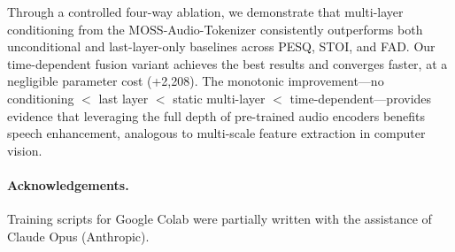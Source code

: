 \documentclass[10pt,twocolumn,letterpaper]{article}
\begin{document}
Through a controlled four-way ablation, we demonstrate that multi-layer conditioning from the MOSS-Audio-Tokenizer consistently outperforms both unconditional and last-layer-only baselines across PESQ, STOI, and FAD.
Our time-dependent fusion variant achieves the best results and converges faster, at a negligible parameter cost (+2,208).
The monotonic improvement---no conditioning $<$ last layer $<$ static multi-layer $<$ time-dependent---provides evidence that leveraging the full depth of pre-trained audio encoders benefits speech enhancement, analogous to multi-scale feature extraction in computer vision.

\paragraph{Acknowledgements.}
Training scripts for Google Colab were partially written with the assistance of Claude Opus (Anthropic).
\end{document}
